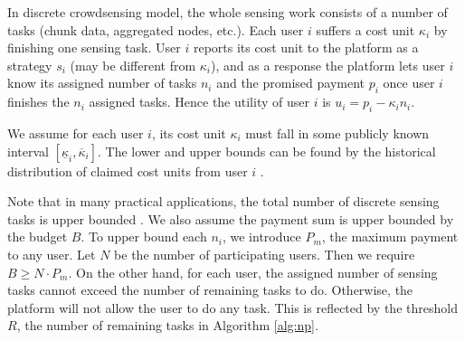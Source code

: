 \documentclass[conference]{IEEEtran}
\theoremstyle{definition}
\begin{document}

In discrete crowdsensing model, the whole sensing work consists of a number of tasks (chunk data, aggregated nodes, etc.). Each user $i$ suffers a cost unit $\kappa_i$ by finishing one sensing task. User $i$ reports its cost unit to the platform as a strategy $s_i$ (may be different from $\kappa_i$), and as a response the platform lets user $i$ know its assigned number of tasks $n_i$ and the promised payment $p_i$ once user $i$ finishes the $n_i$ assigned tasks. Hence the utility of user $i$ is $u_i = p_i - \kappa_i n_i$. %

{\color{blue} 
We assume for each user $i$, its cost unit $\kappa_i$ must fall in some publicly known interval $[\underline{\kappa}_i,\overline{\kappa}_i]$. The lower and upper bounds can be found by the historical distribution of claimed cost units from user $i$ \cite{koutsopoulos2013optimal}.

Note that in many practical applications, the total number of discrete sensing tasks is upper bounded \cite{Alt2010Location,Liu2013A,li2012location}. We also assume the payment sum is upper bounded by the budget $B$. To upper bound each $n_i$, we introduce $P_m$, the maximum payment to any user. Let $N$ be the number of participating users. Then we require $B\geq N \cdot P_m$. On the other hand, for each user, the assigned number of sensing tasks cannot exceed the number of remaining tasks to do. Otherwise, the platform will not allow the user to do any task. This is reflected by the threshold $R$, the number of remaining tasks in Algorithm \ref{alg:np}.
}

\end{document}
